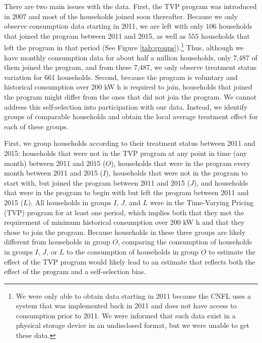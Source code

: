 \documentclass[12pt]{article}
\begin{document}
There are two main issues with the data. First, the TVP program was introduced in 2007 and most of the households joined soon thereafter. Because we only observe consumption data starting in 2011, we are left with only $106$ households that joined the program between 2011 and 2015, as well as $555$ households that left the program in that period (See Figure \ref{tab:groups}).\footnote{We were only able to obtain data starting in 2011 because the CNFL uses a system that was implemented back in 2011 and does not have access to consumption prior to 2011. We were informed that such data exist in a physical storage device in an undisclosed format, but we were unable to get these data.} Thus, although we have monthly consumption data for about half a million households, only 7,487 of them joined the program, and from these 7,487, we only observe treatment status variation for 661 households. Second, because the program is voluntary and historical consumption over 200 kW h is required to join, households that joined the program might differ from the ones that did not join the program. We cannot address this self-selection into participation with our data. Instead, we identify groups of comparable households and obtain the local average treatment effect for each of these groups.

First, we group households according to their treatment status between 2011 and 2015: households that were not in the TVP program at any point in time (any month) between 2011 and 2015 ($O$), households that were in the program every month between 2011 and 2015 ($I$), households that were not in the program to start with, but joined the program between 2011 and 2015 ($J$), and households that were in the program to begin with but left the program between 2011 and 2015 ($L$). All households in groups $I$, $J$, and $L$ were in the Time-Varying Pricing (TVP) program for at least one period, which implies both that they met the requirement of minimum historical consumption over 200 kW h and that they chose to join the program. Because households in these three groups are likely different from households in group $O$, comparing the consumption of households in groups $I$, $J$, or $L$ to the consumption of households in group $O$ to estimate the effect of the TVP program would likely lead to an estimate that reflects both the effect of the program and a self-selection bias.
\end{document}
